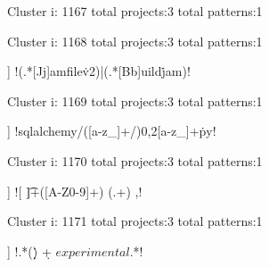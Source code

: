 Cluster i: 1167
total projects:3
total patterns:1
\begin{multicols}{1}
\end{multicols}







Cluster i: 1168
total projects:3
total patterns:1
\begin{multicols}{1}
\begin{description}[noitemsep,topsep=0pt]
\item [[3] ] \cverb!(.*[Jj]amfile\.v2)|(.*[Bb]uild\.jam)!
\end{description}
\end{multicols}







Cluster i: 1169
total projects:3
total patterns:1
\begin{multicols}{1}
\begin{description}[noitemsep,topsep=0pt]
\item [[3] ] \cverb!sqlalchemy/([a-z_]+/){0,2}[a-z_]+\.py!
\end{description}
\end{multicols}







Cluster i: 1170
total projects:3
total patterns:1
\begin{multicols}{1}
\begin{description}[noitemsep,topsep=0pt]
\item [[3] ] \cverb![ \t]+([A-Z0-9]+) \/\* (.+) \*\/,\n!
\end{description}
\end{multicols}







Cluster i: 1171
total projects:3
total patterns:1
\begin{multicols}{1}
\begin{description}[noitemsep,topsep=0pt]
\item [[3] ] \cverb!.*(\d\.\d) \d+ \(experimental\).*!
\end{description}
\end{multicols}







